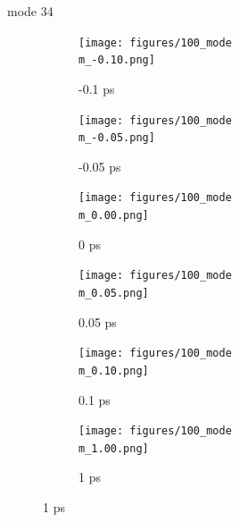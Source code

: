 \documentclass{beamer}
\newcommand\w{0.32}
\begin{document}
\renewcommand\m{34}
\begin{frame}{mode \m}
	\begin{figure}
		\centering
		\begin{subfigure}[b]{\w\textwidth}
			\centering
			\texttt{[image: figures/100\_mode\\m\_-0.10.png]}
			\caption{-0.1 ps}
		\end{subfigure}
		\begin{subfigure}[b]{\w\textwidth}
			\centering
			\texttt{[image: figures/100\_mode\\m\_-0.05.png]}
			\caption{-0.05 ps}
		\end{subfigure}
		\begin{subfigure}[b]{\w\textwidth}
			\centering
			\texttt{[image: figures/100\_mode\\m\_0.00.png]}
			\caption{0 ps}
		\end{subfigure}
		\begin{subfigure}[b]{\w\textwidth}
			\centering
			\texttt{[image: figures/100\_mode\\m\_0.05.png]}
			\caption{0.05 ps}
		\end{subfigure}
		\begin{subfigure}[b]{\w\textwidth}
			\centering
			\texttt{[image: figures/100\_mode\\m\_0.10.png]}
			\caption{0.1 ps}
		\end{subfigure}
		\begin{subfigure}[b]{\w\textwidth}
			\centering
			\texttt{[image: figures/100\_mode\\m\_1.00.png]}
			\caption{1 ps}
		\end{subfigure}
	\end{figure}
\end{frame}
\end{document}

